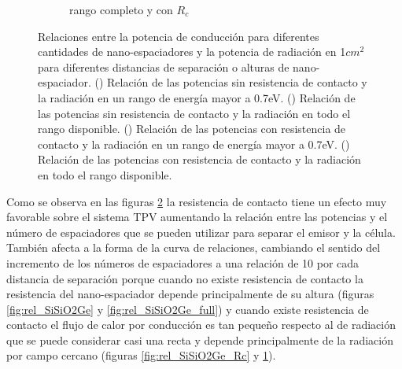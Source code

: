 \begin{figure}[H]
\begin{subfigure}[b]{0.49\textwidth}
		\caption{rango completo y con $R_c$}
		\label{fig:rel_SiSiO2Ge_Rc_full}
	\end{subfigure}
	\caption[Relaciones entre la potencia de conducción para diferentes cantidades de nano-espaciadores y la potencia de radiación en 1$cm^2$ para diferentes distancias de separación o alturas de nano-espaciador]{Relaciones entre la potencia de conducción para diferentes cantidades de nano-espaciadores y la potencia de radiación en 1$cm^2$ para diferentes distancias de separación o alturas de nano-espaciador. () Relación de las potencias sin resistencia de contacto y la radiación en un rango de energía mayor a 0.7eV. () Relación de las potencias sin resistencia de contacto y la radiación en todo el rango disponible. () Relación de las potencias con resistencia de contacto \cite{nf_TPV_Pillars_SiO2} y la radiación en un rango de energía mayor a 0.7eV. () Relación de las potencias con resistencia de contacto \cite{nf_TPV_Pillars_SiO2} y la radiación en todo el rango disponible.}
	\label{fig:relation_SiSiO2Ge}
\end{figure}
Como se observa en las figuras \ref{fig:relation_SiSiO2Ge} la resistencia de contacto tiene un efecto muy favorable sobre el sistema TPV aumentando la relación entre las potencias y el número de espaciadores que se pueden utilizar para separar el emisor y la célula. También afecta a la forma de la curva de relaciones, cambiando el sentido del incremento de los números de espaciadores a una relación de 10 por cada distancia de separación porque cuando no existe resistencia de contacto la resistencia del nano-espaciador depende principalmente de su altura (figuras \ref{fig:rel_SiSiO2Ge} y \ref{fig:rel_SiSiO2Ge_full}) y cuando existe resistencia de contacto el flujo de calor por conducción es tan pequeño respecto al de radiación que se puede considerar casi una recta y depende principalmente de la radiación por campo cercano (figuras \ref{fig:rel_SiSiO2Ge_Rc} y \ref{fig:rel_SiSiO2Ge_Rc_full}). \\\\
